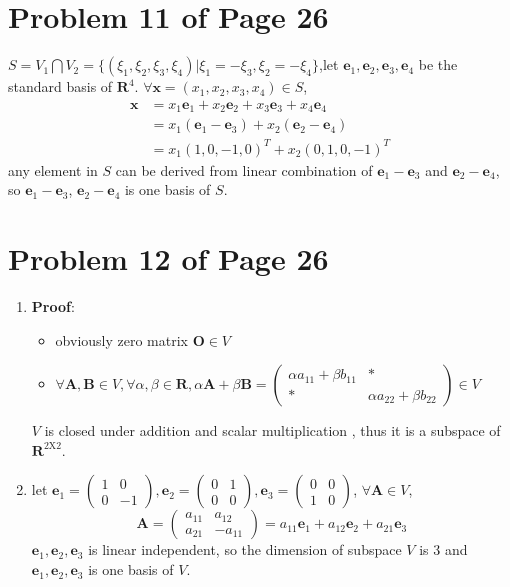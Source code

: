 \documentclass[12pt,a4paper]{article}
\newcommand{\mysection}[2]{
\section{Problem #1 of Page #2}	
	}
\begin{document}
\mysection{11}{26} 
${S} = {V}_1 \bigcap  {V}_2 =
\{(\xi_1,\xi_2,\xi_3,\xi_4)|\xi_1 = -\xi_3, \xi_2 = -\xi_4
\}
$,let $\bm{e}_1,\bm{e}_2,\bm{e}_3,\bm{e}_4$
be the standard basis of $\mathbf{R}^{4}$.
$\forall \bm{x} = (x_1,x_2,x_3,x_4) \in {S}$, \\
\begin{equation}
\begin{split}
\bm{x} &= x_1 \bm{e}_1 + x_2\bm{e}_2 + x_3\bm{e}_3 + x_4\bm{e}_4 \\
&= x_1(\bm{e}_1 -\bm{e}_3) + x_2(\bm{e}_2 - \bm{e}_4) \\
& = x_1(1,0,-1,0)^{T} + x_2 (0,1,0,-1)^{T}
\end{split} 
\end{equation} 
any element in ${S}$ can be derived from linear combination of
$\bm{e}_1 - \bm{e}_3$ and $\bm{e}_2 - \bm{e}_4$,
so $\bm{e}_1 - \bm{e}_3$, $\bm{e}_2 - \bm{e}_4$ is one basis of ${S}$.
\mysection{12}{26}
\begin{enumerate}[(1)]
\item \textbf{Proof}: 
\begin{itemize}
	\item obviously zero matrix $\bm O \in {V}$ 
	\item $\forall \bm{A},\bm{B} \in {V},\forall \alpha,\beta \in \mathbf{R},
		\alpha \bm{A} + \beta \bm{B} = \left(
		\begin{array}{cc}
		 \alpha a_{11} + \beta b_{11} & * \\
		 * & \alpha a_{22} + \beta b_{22}
		\end{array} 
		\right) \in {V}
	$
\end{itemize}
${V}$ is closed under addition and scalar multiplication ,
thus it is a subspace of $\mathbf{R}^{2\text{X}2}$.
\item let $ 
\bm{e}_1 = \left(
	\begin{array}{cc}
	 1 & 0  \\
	 0 & -1  
	\end{array} 
\right),
\bm{e}_2 = \left(
\begin{array}{cc}
0 & 1  \\
0 & 0  
\end{array} 
\right),
\bm{e}_3 = \left(
\begin{array}{cc}
0 & 0  \\
1 & 0  
\end{array} 
\right)
$,
$\forall \bm{A} \in {V}$, \\
\[
\bm{A} = \left( \begin{array}{cc}
a_{11} & a_{12} \\
a_{21} & -a_{11}
\end{array} \right) 
= a_{11}\bm{e}_1 + a_{12}\bm{e}_2 + 
a_{21}\bm{e}_3
\]
$\bm{e}_1,\bm{e}_2,\bm{e}_3$ is linear independent,
so the dimension of subspace ${V}$ is 3
and $\bm{e}_1,\bm{e}_2,\bm{e}_3$ is one basis of ${V}$.

\end{enumerate}
\end{document}
